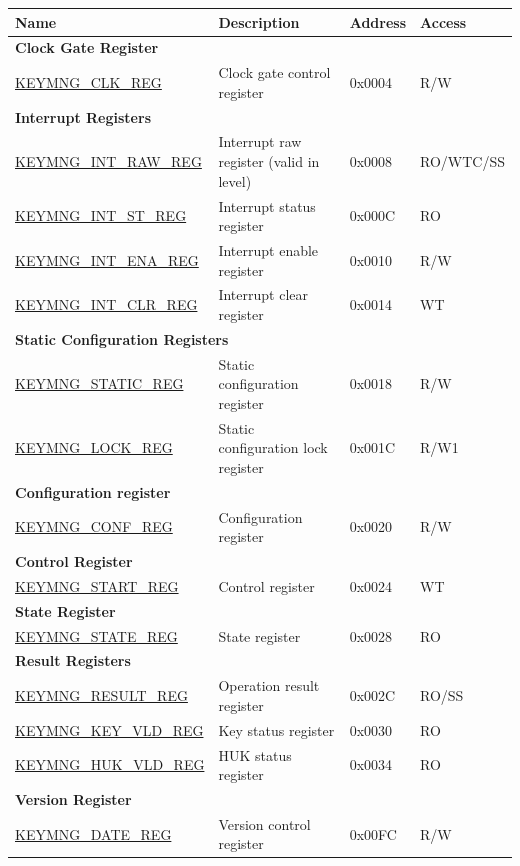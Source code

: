 \begin{longtable}{ | p{6cm} | p{7.2cm} | p{1.3cm} | p{1cm} | }
\hline\rowcolor{lightgray}
\textbf{Name} & \textbf{Description} &  \textbf{Address} & \textbf{Access} \\ \hline
\endhead
\multicolumn{4}{|l|}{\textbf{Clock Gate Register}} \\ \hline
\hyperref[regdesc:KEYMNGCLKREG]{KEYMNG\_CLK\_REG} & Clock gate control register & 0x0004 & R/W \\ \hline
\multicolumn{4}{|l|}{\textbf{Interrupt Registers}} \\ \hline
\hyperref[regdesc:KEYMNGINTRAWREG]{KEYMNG\_INT\_RAW\_REG} & Interrupt raw register (valid in level) & 0x0008 & RO/WTC/SS \\ \hline
\hyperref[regdesc:KEYMNGINTSTREG]{KEYMNG\_INT\_ST\_REG} & Interrupt status register & 0x000C & RO \\ \hline
\hyperref[regdesc:KEYMNGINTENAREG]{KEYMNG\_INT\_ENA\_REG} & Interrupt enable register & 0x0010 & R/W \\ \hline
\hyperref[regdesc:KEYMNGINTCLRREG]{KEYMNG\_INT\_CLR\_REG} & Interrupt clear register & 0x0014 & WT \\ \hline
\multicolumn{4}{|l|}{\textbf{Static Configuration Registers}} \\ \hline
\hyperref[regdesc:KEYMNGSTATICREG]{KEYMNG\_STATIC\_REG} & Static configuration register & 0x0018 & R/W \\ \hline
\hyperref[regdesc:KEYMNGLOCKREG]{KEYMNG\_LOCK\_REG} & Static configuration lock register & 0x001C & R/W1 \\ \hline
\multicolumn{4}{|l|}{\textbf{Configuration register}} \\ \hline
\hyperref[regdesc:KEYMNGCONFREG]{KEYMNG\_CONF\_REG} & Configuration register & 0x0020 & R/W \\ \hline
\multicolumn{4}{|l|}{\textbf{Control Register}} \\ \hline
\hyperref[regdesc:KEYMNGSTARTREG]{KEYMNG\_START\_REG} & Control register & 0x0024 & WT \\ \hline
\multicolumn{4}{|l|}{\textbf{State Register}} \\ \hline
\hyperref[regdesc:KEYMNGSTATEREG]{KEYMNG\_STATE\_REG} & State register & 0x0028 & RO \\ \hline
\multicolumn{4}{|l|}{\textbf{Result Registers}} \\ \hline
\hyperref[regdesc:KEYMNGRESULTREG]{KEYMNG\_RESULT\_REG} & Operation result register & 0x002C & RO/SS \\ \hline
\hyperref[regdesc:KEYMNGKEYVLDREG]{KEYMNG\_KEY\_VLD\_REG} & Key status register & 0x0030 & RO \\ \hline
\hyperref[regdesc:KEYMNGHUKVLDREG]{KEYMNG\_HUK\_VLD\_REG} & HUK status register & 0x0034 & RO \\ \hline
\multicolumn{4}{|l|}{\textbf{Version Register}} \\ \hline
\hyperref[regdesc:KEYMNGDATEREG]{KEYMNG\_DATE\_REG} & Version control register & 0x00FC & R/W \\ \hline
\end{longtable}